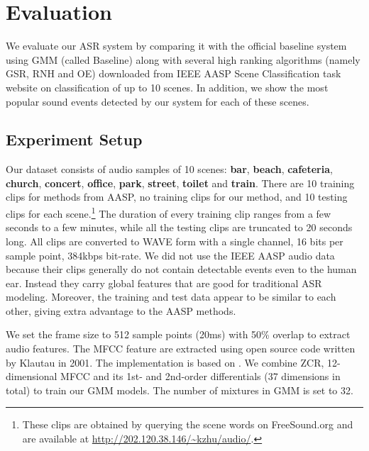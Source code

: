\section{Evaluation}
\label{sec:eval}
We evaluate our ASR system by comparing it with the official
baseline system using GMM (called Baseline) along with several
high ranking algorithms (namely GSR, RNH and OE) downloaded from IEEE AASP
Scene Classification task website\cite{6701819}
on classification of up to 10 scenes.
In addition, we show the most popular sound events detected by our system
for each of these scenes.


\subsection{Experiment Setup}
Our dataset consists of audio samples of 10 scenes:
{\bf bar}, {\bf beach}, {\bf cafeteria}, {\bf church},
{\bf concert}, {\bf office}, {\bf park}, {\bf street},
{\bf toilet} and {\bf train}.
There are 10 training clips for methods from AASP, no training clips
for our method,
and 10 testing clips for each scene.\footnote{These
clips are obtained by querying the scene words on FreeSound.org and
are available at \url{http://202.120.38.146/~kzhu/audio/}.}
The duration of every
training clip ranges from a few seconds to a few minutes, while all the
testing clips are truncated to 20 seconds long.
All clips are converted to WAVE form with a single channel,
16 bits per sample point, 384kbps bit-rate.
We did not use the IEEE AASP audio data because their clips generally
do not contain detectable events even to the human ear. Instead they
carry global features that are good for traditional ASR modeling.
Moreover, the training and test data appear to be similar to each other,
giving extra advantage to the AASP methods.

We set the frame size to 512 sample points (20ms) with 50\% overlap
to extract audio features.
The MFCC feature are extracted using open source code written by Klautau
in 2001. The implementation is based on \cite{1163420, 237532,397093,
Cardin:1993:ICM:1946943.1947011}. We combine ZCR, 12-dimensional MFCC
and its 1st- and 2nd-order differentials (37 dimensions in total)
to train our GMM models. The number of mixtures in GMM is set to 32.

